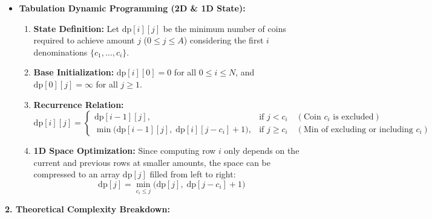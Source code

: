 \documentclass[12pt]{article}
\begin{document}
\begin{itemize}
    \item \textbf{Tabulation Dynamic Programming (2D \& 1D State):}
    \begin{enumerate}
        \item \textbf{State Definition:} Let $\text{dp}[i][j]$ be the minimum number of coins required to achieve amount $j$ ($0 \le j \le A$) considering the first $i$ denominations $\{c_1, \dots, c_i\}$.
        \item \textbf{Base Initialization:} $\text{dp}[i][0] = 0$ for all $0 \le i \le N$, and $\text{dp}[0][j] = \infty$ for all $j \ge 1$.
        \item \textbf{Recurrence Relation:}
        \[
        \text{dp}[i][j] = 
        \begin{cases} 
        \text{dp}[i-1][j], & \text{if } j < c_i \quad (\text{Coin } c_i \text{ is excluded}) \\
        \min\Big(\text{dp}[i-1][j], \; \text{dp}[i][j - c_i] + 1\Big), & \text{if } j \ge c_i \quad (\text{Min of excluding or including } c_i)
        \end{cases}
        \]
        \item \textbf{1D Space Optimization:} Since computing row $i$ only depends on the current and previous rows at smaller amounts, the space can be compressed to an array $\text{dp}[j]$ filled from left to right:
        \[
        \text{dp}[j] = \min_{c_i \le j} \big(\text{dp}[j], \; \text{dp}[j - c_i] + 1\big)
        \]
    \end{enumerate}
\end{itemize}

\textbf{2. Theoretical Complexity Breakdown:}
\end{document}
